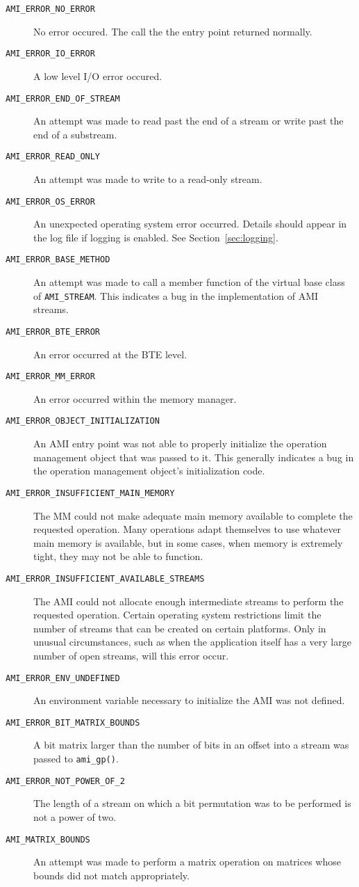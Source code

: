 \begin{description}
\item[{\tt AMI\_ERROR\_NO\_ERROR}] No error occured.  The call the the
  entry point returned normally.
\item[{\tt AMI\_ERROR\_IO\_ERROR}] A low level I/O error occured.
\item[{\tt AMI\_ERROR\_END\_OF\_STREAM}] An attempt was made to read
  past the end of a stream or write past the end of a substream.
\item[{\tt AMI\_ERROR\_READ\_ONLY}] An attempt was made to write to a
  read-only stream.
\item[{\tt AMI\_ERROR\_OS\_ERROR}]  An unexpected operating system
  error occurred.  Details should appear in the log file if logging is
  enabled.  See Section~\ref{sec:logging}.
\item[{\tt AMI\_ERROR\_BASE\_METHOD}] An attempt was made to call a
  member function of the virtual base class of {\tt AMI\_STREAM}.  This
  indicates a bug in the implementation of AMI streams.
\item[{\tt AMI\_ERROR\_BTE\_ERROR}] An error occurred at the BTE
  level.  
\item[{\tt AMI\_ERROR\_MM\_ERROR}] An error occurred within the memory
  manager.
\item[{\tt AMI\_ERROR\_OBJECT\_INITIALIZATION}] An AMI entry point was
  not able to properly initialize the operation management object that
  was passed to it.  This generally indicates a bug in the operation
  management object's initialization code.
\item[{\tt AMI\_ERROR\_INSUFFICIENT\_MAIN\_MEMORY}] The MM could not
  make adequate main memory available to complete the requested
  operation.  Many operations adapt themselves to use whatever main
  memory is available, but in some cases, when memory is extremely
  tight, they may not be able to function.
\item[{\tt AMI\_ERROR\_INSUFFICIENT\_AVAILABLE\_STREAMS}]
  The AMI could not allocate enough intermediate streams to perform
  the requested operation.  Certain operating system restrictions
  limit the number of streams that can be created on certain
  platforms.  Only in unusual circumstances, such as when the
  application itself has a very large number of open streams, will
  this error occur. 
\item[{\tt AMI\_ERROR\_ENV\_UNDEFINED}]
  An environment variable necessary to initialize the AMI was not defined.
\item[{\tt AMI\_ERROR\_BIT\_MATRIX\_BOUNDS}]
  A bit matrix larger than the number of bits in an offset into a
  stream was passed to \verb|ami_gp()|.
\item[{\tt AMI\_ERROR\_NOT\_POWER\_OF\_2}]
  The length of a stream on which a bit permutation was to be
  performed is not a power of two.
\item[{\tt AMI\_MATRIX\_BOUNDS}] An attempt was made to perform a
  matrix operation on matrices whose bounds did not match appropriately.
\end{description}


